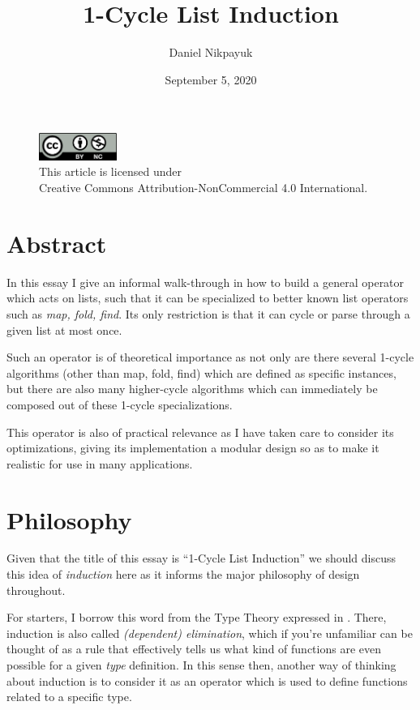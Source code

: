 \documentclass[twoside]{article}
\title{1-Cycle List Induction}
\author{Daniel Nikpayuk}
\date{September 5, 2020}
\begin{document}
\maketitle
\thispagestyle{empty}

\begin{figure}[h]
\centering
\includegraphics[width=1in]{../cc-by-nc.png}\\[0.1in]
\tiny This article is licensed under \\
Creative Commons Attribution-NonCommercial 4.0 International.\\[0.3in]
\end{figure}

\section*{Abstract}

In this essay I give an informal walk-through in how to build a general operator which acts on lists, such that it can
be specialized to better known list operators such as \emph{map, fold, find}. Its only restriction is that it can cycle
or parse through a given list at most once.

Such an operator is of theoretical importance as not only are there several 1-cycle algorithms (other than map, fold, find)
which are defined as specific instances, but there are also many higher-cycle algorithms which can immediately be composed
out of these 1-cycle specializations.

This operator is also of practical relevance as I have taken care to consider its optimizations, giving its implementation
a modular design so as to make it realistic for use in many applications.

\section*{Philosophy}

Given that the title of this essay is ``1-Cycle List Induction'' we should discuss this idea of \emph{induction}
here as it informs the major philosophy of design throughout.

For starters, I borrow this word from the Type Theory expressed in \cite{hott}. There, induction is also called
\emph{(dependent) elimination}, which if you're unfamiliar can be thought of as a rule that effectively tells us what
kind of functions are even possible for a given \emph{type} definition. In this sense then, another way of thinking
about induction is to consider it as an operator which is used to define functions related to a specific type.
\end{document}
